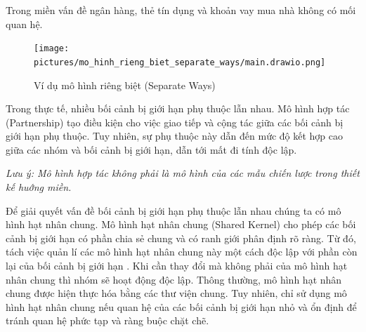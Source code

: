 \begin{example} Trong miền vấn đề ngân hàng, thẻ tín dụng và khoản vay mua nhà không có mối quan hệ.

    \begin{figure}[H]

        \centering

        \texttt{[image: pictures/mo\_hinh\_rieng\_biet\_separate\_ways/main.drawio.png]}

        \caption{Ví dụ mô hình riêng biệt (Separate Ways)}

    \end{figure}

\end{example}


Trong thực tế, nhiều bối cảnh bị giới hạn phụ thuộc lẫn nhau. Mô hình hợp tác (Partnership) tạo điều kiện cho việc giao tiếp và cộng tác giữa các bối cảnh bị giới hạn phụ thuộc. Tuy nhiên, sự phụ thuộc này dẫn đến mức độ kết hợp cao giữa các nhóm và bối cảnh bị giới hạn, dẫn tới mất đi tính độc lập.

\textit{Lưu ý: Mô hình hợp tác không phải là mô hình của các mẫu chiến lược trong thiết kế huớng miền.}

Để giải quyết vấn đề bối cảnh bị giới hạn phụ thuộc lẫn nhau chúng ta có mô hình hạt nhân chung. Mô hình hạt nhân chung (Shared Kernel) cho phép các bối cảnh bị giới hạn có phần chia sẻ chung và có ranh giới phân định rõ ràng. Từ đó, tách việc quản lí các mô hình hạt nhân chung này một cách độc lập với phần còn lại của bối cảnh bị giới hạn . Khi cần thay đổi mà không phải của mô hình hạt nhân chung thì nhóm sẽ hoạt động độc lập. Thông thường, mô hình hạt nhân chung được hiện thực hóa bằng các thư viện chung. Tuy nhiên, chỉ sử dụng mô hình hạt nhân chung nếu quan hệ của các bối cảnh bị giới hạn nhỏ và ổn định để tránh quan hệ phức tạp và ràng buộc chặt chẽ.







